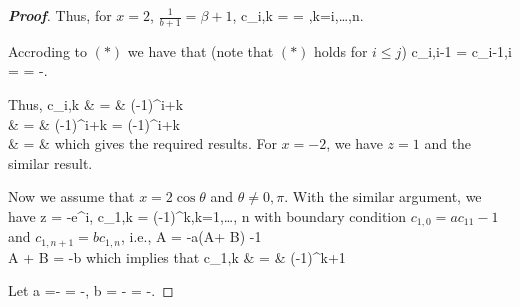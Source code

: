 \begin{proof}[\bf Proof]
Thus, for $x=2$, $\frac 1{b+1} = \beta + 1$,
\be
c_{i,k} =  =  ,\quad k=i,\dots,n.
\ee

Accroding to $(*)$ we have that (note that $(*)$ holds for $i\leq j$)
\be
c_{i,i-1} = c_{i-1,i} = = -.
\ee

Thus,
\beast
c_{i,k} & = & (-1)^{i+k} \\
& = &  (-1)^{i+k} = (-1)^{i+k} \\
& = & 
\eeast
which gives the required results. For $x=-2$, we have $z=1$ and the similar result.

Now we assume that $x=2\cos\theta$ and $\theta \neq 0,\pi$. With the similar argument, we have
\be
z = -e^{\pm i\theta}, \qquad c_{1,k} = (-1)^k,\qquad k=1,\dots, n
\ee
with boundary condition  $c_{1,0} = ac_{11}-1$ and $c_{1,n+1} = bc_{1,n}$, i.e.,
\be
{}
A = -a(A\cos\theta + B\sin\theta) -1 \\
A\cos{} + B\sin{} = -b
\ea
\ee
which implies that
\beast
c_{1,k} & = & (-1)^{k+1}
\eeast


Let
\beast
a =- = -,\quad
b = - = -.
\eeast


\end{proof}
